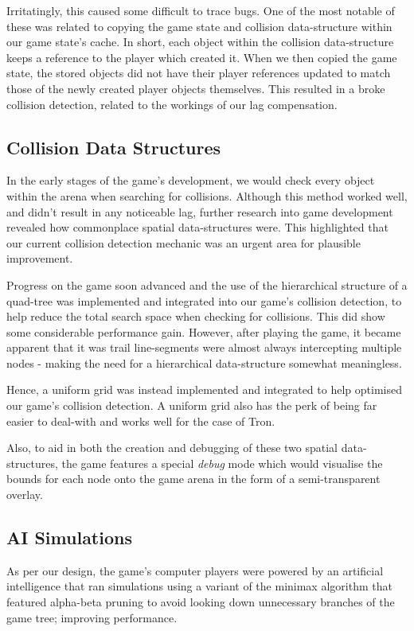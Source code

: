 \documentclass{standalone}
\begin{document}
			Irritatingly, this caused some difficult to trace bugs. One of the most notable of these was related to copying the game state and collision data-structure within our game state's cache. In short, each object within the collision data-structure keeps a reference to the player which created it. When we then copied the game state, the stored objects did not have their player references updated to match those of the newly created player objects themselves. This resulted in a broke collision detection, related to the workings of our lag compensation.

		\subsection{Collision Data Structures}
			In the early stages of the game's development, we would check every object within the arena when searching for collisions. Although this method worked well, and didn't result in any noticeable lag, further research into game development revealed how commonplace spatial data-structures were. This highlighted that our current collision detection mechanic was an urgent area for plausible improvement.

			Progress on the game soon advanced and the use of the hierarchical structure of a quad-tree was implemented and integrated into our game's collision detection, to help reduce the total search space when checking for collisions. This did show some considerable performance gain. However, after playing the game, it became apparent that it was trail line-segments were almost always intercepting multiple nodes - making the need for a hierarchical data-structure somewhat meaningless.

			Hence, a uniform grid was instead implemented and integrated to help optimised our game's collision detection. A uniform grid also has the perk of being far easier to deal-with and works well for the case of Tron.

			Also, to aid in both the creation and debugging of these two spatial data-structures, the game features a special \emph{debug} mode which would visualise the bounds for each node onto the game arena in the form of a semi-transparent overlay.

		\subsection{AI Simulations}
			As per our design, the game's computer players were powered by an artificial intelligence that ran simulations using a variant of the minimax algorithm \parencite{minimax} that featured alpha-beta pruning \parencite{alphaBeta} to avoid looking down unnecessary branches of the game tree; improving performance.
\end{document}
